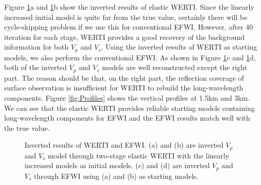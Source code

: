 Figure \ref{fig:InvertedModel}a and \ref{fig:InvertedModel}b show the inverted results of elastic WERTI.
Since the linearly increased initial model is quite far from the true value, certainly there will be
cycle-skipping problem if we use this for conventional EFWI. However, after
40 iteration for each stage, WERTI provides a good recovery of the background
information for both $V_p$ and $V_s$. Using the inverted results of WERTI as starting
models, we also perform the conventional EFWI. As shown in Figure \ref{fig:InvertedModel}c and
\ref{fig:InvertedModel}d, both of the inverted $V_p$ and $V_s$ models are well
reconstructed except the right part.
The reason should be that, on the right part, the reflection coverage of surface observation is insufficient for
WERTI to rebuild the long-wavelength components. 
Figure \ref{fig:Profiles} shows the vertical profiles at 1.5km and 3km. 
We can see that the elastic WERTI provides reliable starting models containing long-wavelength
components for EFWI and the EFWI results match well with the true value.
\begin{figure}[!htb]
   \centering
   \caption{Inverted results of WERTI and EFWI. (a) and (b) are inverted $V_p$ and
	   $V_s$ model through two-stage elastic WERTI with the linearly increased models
	   as initial models. (c) and (d) are inverted $V_p$ and $V_s$ through EFWI using
   (a) and (b) as starting models.}
   \label{fig:InvertedModel}
\end{figure}
